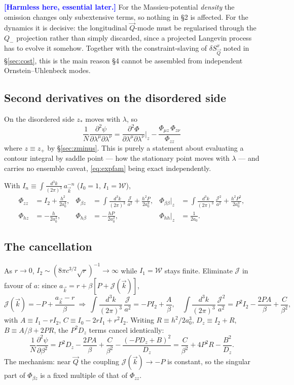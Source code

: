 \documentclass[11pt,a4paper]{article}
\newcommand{\Jc}{\mathcal{J}}
\newcommand{\bk}{\vec k}
\newcommand{\bQ}{\vec Q}
\newcommand{\dk}{\frac{d^3k}{(2\pi)^3}}
\newcommand{\Wc}{\mathcal{W}}
\newcommand{\FLAG}[1]{\textcolor{blue}{\textbf{[#1]}}}
\newcommand{\Jc}{\mathcal{J}}
\newcommand{\bk}{\vec k}
\newcommand{\bQ}{\vec Q}
\newcommand{\dk}{\frac{d^3k}{(2\pi)^3}}
\newcommand{\Wc}{\mathcal{W}}
\newcommand{\FLAG}[1]{\textcolor{blue}{\textbf{[#1]}}}
\begin{document}
\FLAG{Harmless here, essential later.} For the Massieu-potential \emph{density} the omission
changes only subextensive terms, so nothing in \S2 is affected. For the dynamics it is
decisive: the longitudinal $\bQ$-mode must be regularised through the $Q_-$ projection
rather than simply discarded, since a projected Langevin process has to evolve it somehow.
Together with the constraint-slaving of $\delta S^x_{\bQ}$ noted in \S\ref{sec:cost}, this
is the main reason \S4 cannot be assembled from independent Ornstein--Uhlenbeck modes.

\subsection{Second derivatives on the disordered side}
On the disordered side $z_*$ moves with $\lambda$, so
\begin{equation}
  \boxed{\
  \frac{1}{N}\frac{\partial^2\psi}{\partial\lambda^\mu\partial\lambda^\nu}
  =\frac{\partial^2\Phi}{\partial\lambda^\mu\partial\lambda^\nu}\bigg|_z
   -\frac{\Phi_{\mu z}\,\Phi_{z\nu}}{\Phi_{zz}} \ }
  \label{eq:hessian}
\end{equation}
where $z\equiv z_+$ by \S\ref{sec:zminus}. This is purely a statement about evaluating a
contour integral by saddle point --- how the stationary point moves with $\lambda$ --- and
carries no ensemble caveat, \eqref{eq:expfam} being exact independently.

With $I_n\equiv\int\!\dk\,a_{\bk}^{-n}$ ($I_0=1$, $I_1=\Wc$),
\begin{align}
  \Phi_{zz}&=I_2+\frac{h^2}{2a_0^3},
  &\Phi_{\beta z}&=\int\!\dk\,\frac{\Jc}{a^2}+\frac{h^2P}{2a_0^3},
  &\Phi_{\beta\beta}\big|_z&=\int\!\dk\,\frac{\Jc^2}{a^2}+\frac{h^2P^2}{2a_0^3},\nonumber\\
  \Phi_{hz}&=-\frac{h}{2a_0^2},
  &\Phi_{h\beta}&=-\frac{hP}{2a_0^2},
  &\Phi_{hh}\big|_z&=\frac{1}{2a_0}.
\end{align}

\subsection{The cancellation}
\label{sec:cancel}
As $r\to0$, $I_2\sim(8\pi c^{3/2}\sqrt r)^{-1}\to\infty$ while $I_1=\Wc$ stays finite.
Eliminate $\Jc$ in favour of $a$: since $a_{\bk}=r+\beta[P+\Jc(\bk)]$,
\begin{equation}
  \Jc(\bk)=-P+\frac{a_{\bk}-r}{\beta}
  \ \Longrightarrow\
  \int\!\dk\,\frac{\Jc}{a^2}=-PI_2+\frac{A}{\beta},
  \quad
  \int\!\dk\,\frac{\Jc^2}{a^2}=P^2I_2-\frac{2PA}{\beta}+\frac{C}{\beta^2},
\end{equation}
with $A\equiv I_1-rI_2$, $C\equiv I_0-2rI_1+r^2I_2$. Writing $R\equiv h^2/2a_0^3$,
$D_z\equiv I_2+R$, $B\equiv A/\beta+2PR$, the $P^2D_z$ terms cancel identically:
\begin{equation}
  \frac{1}{N}\frac{\partial^2\psi}{\partial\beta^2}
  =P^2D_z-\frac{2PA}{\beta}+\frac{C}{\beta^2}-\frac{(-PD_z+B)^2}{D_z}
   =\frac{C}{\beta^2}+4P^2R-\frac{B^2}{D_z} .
  \label{eq:cancelled}
\end{equation}
The mechanism: near $\bQ$ the coupling $\Jc(\bk)\to-P$ is constant, so the singular part of
$\Phi_{\beta z}$ is a fixed multiple of that of $\Phi_{zz}$.
\end{document}

